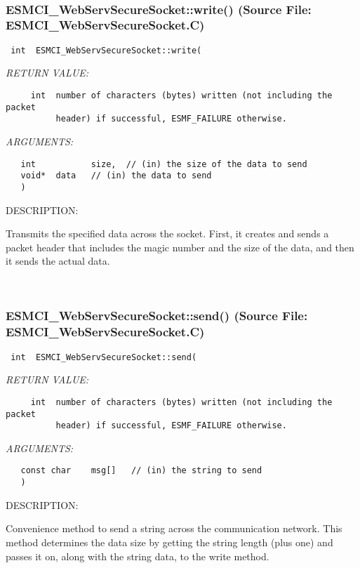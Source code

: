  
\mbox{}\hrulefill\
 
\subsubsection{ESMCI\_WebServSecureSocket::write() (Source File: ESMCI\_WebServSecureSocket.C)}


  
\begin{verbatim} int  ESMCI_WebServSecureSocket::write(\end{verbatim}{\em RETURN VALUE:}
\begin{verbatim}     int  number of characters (bytes) written (not including the packet
          header) if successful, ESMF_FAILURE otherwise.\end{verbatim}{\em ARGUMENTS:}
\begin{verbatim}   int           size,  // (in) the size of the data to send
   void*  data   // (in) the data to send
   )\end{verbatim}
{\sf DESCRIPTION:\\ }


      Transmits the specified data across the socket.  First, it creates and
      sends a packet header that includes the magic number and the size of the
      data, and then it sends the actual data.
   
 
\mbox{}\hrulefill\
 
\subsubsection{ESMCI\_WebServSecureSocket::send() (Source File: ESMCI\_WebServSecureSocket.C)}


  
\begin{verbatim} int  ESMCI_WebServSecureSocket::send(\end{verbatim}{\em RETURN VALUE:}
\begin{verbatim}     int  number of characters (bytes) written (not including the packet
          header) if successful, ESMF_FAILURE otherwise.\end{verbatim}{\em ARGUMENTS:}
\begin{verbatim}   const char    msg[]   // (in) the string to send
   )\end{verbatim}
{\sf DESCRIPTION:\\ }


      Convenience method to send a string across the communication network.
      This method determines the data size by getting the string length (plus
      one) and passes it on, along with the string data, to the write method.
  
\setlength{\parskip}{\oldparskip}
\setlength{\parindent}{\oldparindent}
\setlength{\baselineskip}{\oldbaselineskip}

